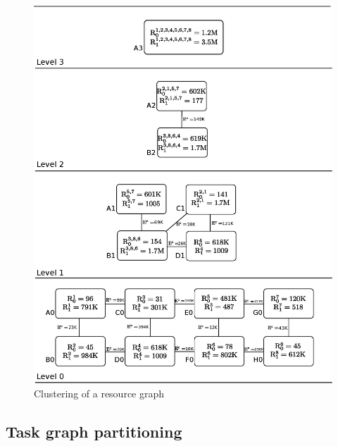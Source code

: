 \begin{figure}[ht]
  \includegraphics[scale=0.43]{./figures/resource}
  \caption{Clustering of a resource graph}
  \label{fig:res}
\end{figure}


\subsection{Task graph partitioning}
\label{sec:task-graph-part}

